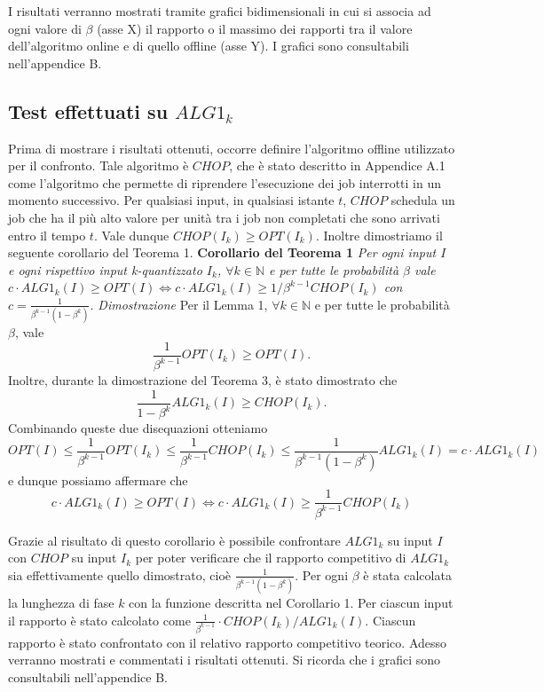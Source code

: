 \documentclass[12pt]{article}
\newcommand*{\N}{\mathbb{N}}
\begin{document}
I risultati verranno mostrati tramite grafici bidimensionali in cui si associa ad ogni valore di $\beta$ (asse X) il rapporto o il massimo dei rapporti tra il valore dell'algoritmo online e di quello offline (asse Y). I grafici sono consultabili nell'appendice B.

\subsection{Test effettuati su $ALG1_{k}$}
Prima di mostrare i risultati ottenuti, occorre definire l’algoritmo offline utilizzato per il confronto. Tale algoritmo è $CHOP$, che è stato descritto in Appendice A.1 come l’algoritmo che permette di riprendere l’esecuzione dei job interrotti in un momento successivo. Per qualsiasi input, in qualsiasi istante $t$, $CHOP$ schedula un job che ha il più alto valore per unità tra i job non completati che sono arrivati entro il tempo $t$. Vale dunque $CHOP(I_{k}) \geq OPT(I_{k})$. Inoltre dimostriamo il seguente corollario del Teorema 1.
\newline \newline
\textbf{Corollario del Teorema 1}
\textit{Per ogni input $I$ e ogni rispettivo input k-quantizzato $I_{k}$, $\forall k \in \N$ e per tutte le probabilità $\beta$ vale
$c \cdot ALG1_{k}(I) \geq OPT(I) \iff c \cdot ALG1_{k}(I) \geq 1/\beta^{k-1} CHOP(I_{k})$
 con $c = \frac{1}{\beta^{k-1}(1 - \beta^{k})}$.}
\newline \newline
\textit{Dimostrazione} 
Per il Lemma 1, $\forall k \in \N$ e per tutte le probabilità $\beta$, vale $$\frac{1}{\beta^{k-1}} OPT(I_{k}) \geq OPT(I).$$
Inoltre, durante la dimostrazione del Teorema 3, è stato dimostrato che $$\frac{1}{1 - \beta^{k}} ALG1_{k}(I) \geq CHOP(I_{k}).$$
Combinando queste due disequazioni otteniamo
$$OPT(I) \leq \frac{1}{\beta^{k-1}} OPT(I_{k}) \leq \frac{1}{\beta^{k-1}} CHOP(I_{k}) \leq \frac{1}{\beta^{k-1}(1 - \beta^{k})} ALG1_{k}(I) = c \cdot ALG1_{k}(I)$$
e dunque possiamo affermare che
\begin{equation}
c \cdot ALG1_{k}(I) \geq OPT(I) \iff c \cdot ALG1_{k}(I) \geq \frac{1}{\beta^{k-1}} CHOP(I_{k}) \tag*{$\square$}
\end{equation}

Grazie al risultato di questo corollario è possibile confrontare $ALG1_{k}$ su input $I$ con $CHOP$ su input $I_{k}$ per poter verificare che il rapporto competitivo di $ALG1_{k}$ sia effettivamente quello dimostrato, cioè $\frac{1}{\beta^{k-1}(1 - \beta^{k})}$. Per ogni $\beta$ è stata calcolata la lunghezza di fase $k$ con la funzione descritta nel Corollario 1. Per ciascun input il rapporto è stato calcolato come $\frac{1}{\beta^{k-1}} \cdot CHOP(I_{k}) / ALG1_{k}(I)$. Ciascun rapporto è stato confrontato con il relativo rapporto competitivo teorico. Adesso verranno mostrati e commentati i risultati ottenuti. Si ricorda che i grafici sono consultabili nell'appendice B.
\end{document}
